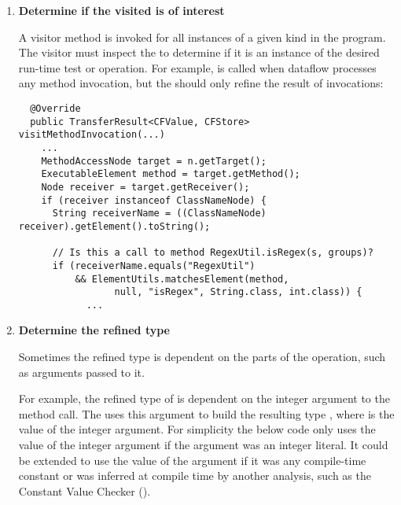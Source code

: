 \begin{enumerate}
\item \textbf{Determine if the visited  is of
    interest}

A visitor method is invoked for all
instances of a given  kind in the
program.
The visitor must inspect the
 to determine if it is an
instance of the desired run-time test or operation.  For example,
 is called when dataflow processes any method
invocation, but the  should only refine
the result of  invocations:

\begin{smaller}
\begin{Verbatim}
  @Override
  public TransferResult<CFValue, CFStore> visitMethodInvocation(...)
    ...
    MethodAccessNode target = n.getTarget();
    ExecutableElement method = target.getMethod();
    Node receiver = target.getReceiver();
    if (receiver instanceof ClassNameNode) {
      String receiverName = ((ClassNameNode) receiver).getElement().toString();

      // Is this a call to method RegexUtil.isRegex(s, groups)?
      if (receiverName.equals("RegexUtil")
          && ElementUtils.matchesElement(method,
                 null, "isRegex", String.class, int.class)) {
            ...
\end{Verbatim}
\end{smaller}

\item \textbf{Determine the refined type}

Sometimes the refined type is dependent on the parts of the operation,
such as arguments passed to it.

For example, the refined type of  is dependent on the
integer argument to the method call. The 
uses this argument to build the resulting type , where 
is the value of the integer argument.  For simplicity the below code only uses
the value of the integer argument if the argument was an integer literal.  It
could be extended to use the value of the argument if it was any compile-time
constant or was inferred at compile time by another analysis, such as the
Constant Value Checker ().


\end{enumerate}
